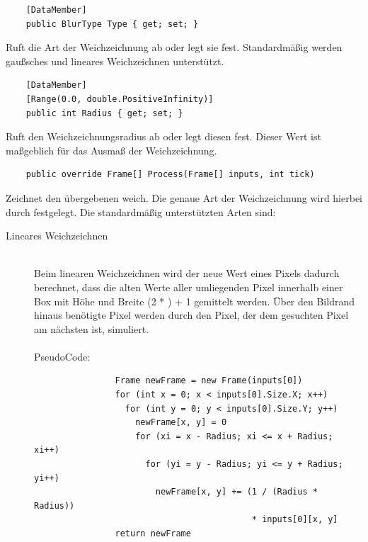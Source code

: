 \begin{itemize}

	\begin{verbatim}
	[DataMember]
	public BlurType Type { get; set; }
	\end{verbatim}
	Ruft die Art der Weichzeichnung ab oder legt sie fest. Standardmäßig werden gaußsches und lineares Weichzeichnen unterstützt.
	
	\begin{verbatim}
	[DataMember]
	[Range(0.0, double.PositiveInfinity)]
	public int Radius { get; set; }
	\end{verbatim}
	Ruft den Weichzeichnungsradius ab oder legt diesen fest. Dieser Wert ist maßgeblich für das Ausmaß der Weichzeichnung.

	\begin{verbatim}
	public override Frame[] Process(Frame[] inputs, int tick)
	\end{verbatim}
	Zeichnet den übergebenen  weich. Die genaue Art der Weichzeichnung wird hierbei durch  festgelegt. Die standardmäßig unterstützten Arten sind:
	\begin{description}
		\item[Lineares Weichzeichnen]~\\
			Beim linearen Weichzeichnen wird der neue Wert eines Pixels dadurch berechnet, dass die alten Werte aller umliegenden Pixel innerhalb einer Box mit Höhe und Breite (2 * ) + 1 gemittelt werden. Über den Bildrand hinaus benötigte Pixel werden durch den Pixel, der dem gesuchten Pixel am nächsten ist, simuliert. ~\\~\\
			PseudoCode:
			\begin{verbatim}
				Frame newFrame = new Frame(inputs[0])
				for (int x = 0; x < inputs[0].Size.X; x++)
				  for (int y = 0; y < inputs[0].Size.Y; y++)
				    newFrame[x, y] = 0
				    for (xi = x - Radius; xi <= x + Radius; xi++)
				      for (yi = y - Radius; yi <= y + Radius; yi++)
				        newFrame[x, y] += (1 / (Radius * Radius))
				                           * inputs[0][x, y]
				return newFrame
				

\end{verbatim}
\end{description}
\end{itemize}
